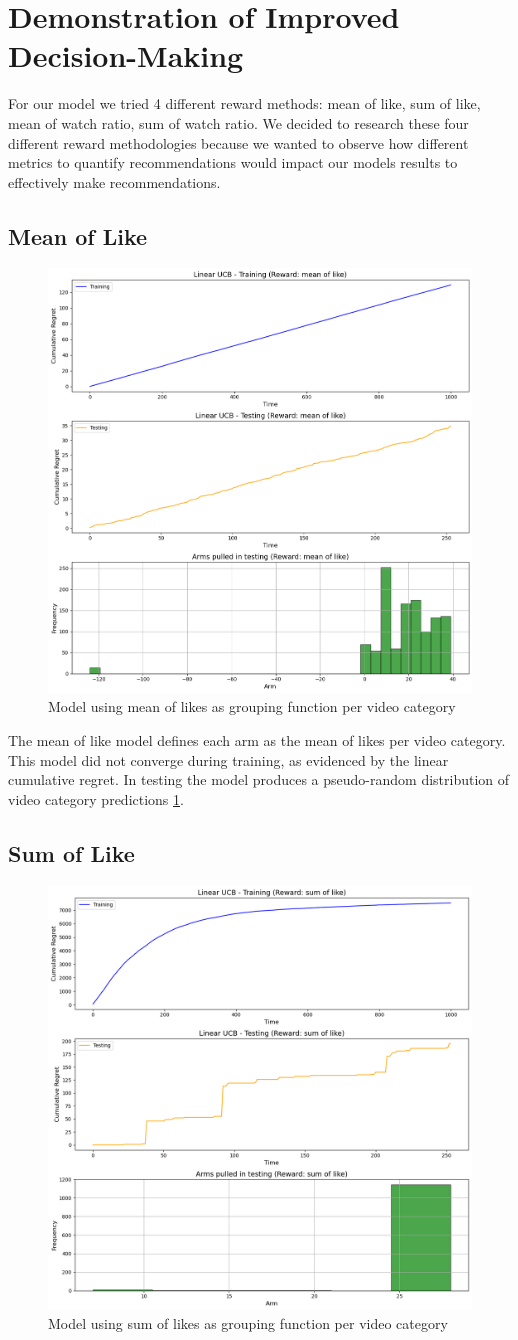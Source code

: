 \section{Demonstration of Improved Decision-Making}

For our model we tried 4 different reward methods: mean of like, sum of like, mean of watch ratio, sum of watch ratio. We decided to research these four different reward methodologies because we wanted to observe how different metrics to quantify recommendations would impact our models results to effectively make recommendations. 

\subsection{Mean of Like}

\begin{figure}
    \centering
    \includegraphics[width=0.5\linewidth]{mean_like.png}
    \caption{Model using mean of likes as grouping function per video category}
    \label{mean_like}
\end{figure}

The mean of like model defines each arm as the mean of likes per video category. This model did not converge during training, as evidenced by the linear cumulative regret. In testing the model produces a pseudo-random distribution of video category predictions \ref{mean_like}.

\subsection{Sum of Like}

\begin{figure}
    \centering
    \includegraphics[width=0.5\linewidth]{sum_like.png}
    \caption{Model using sum of likes as grouping function per video category}
    \label{sum_like}
\end{figure}

